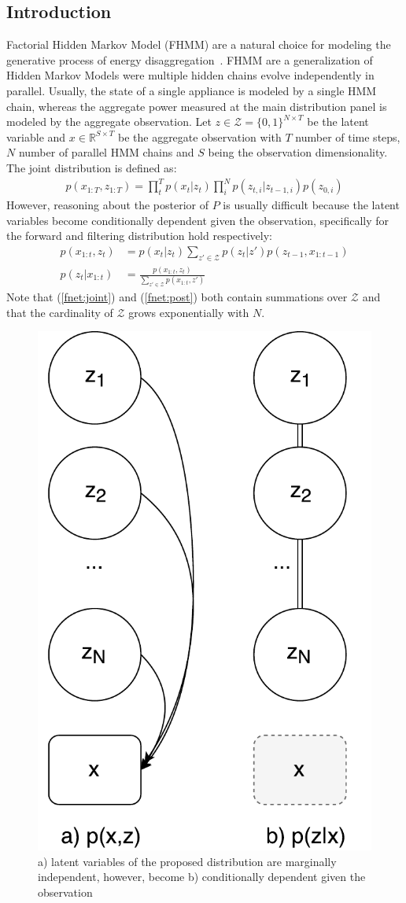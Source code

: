 \subsection{Introduction}
Factorial Hidden Markov Model \cite{ghahramani1997factorial} (FHMM) are a natural choice for modeling the generative process of energy disaggregation~\cite{kolter2012fhmm,lange2016varbolt,ng2016scaling,hart1992}. FHMM are a generalization of Hidden Markov Models were multiple hidden chains evolve independently in parallel. Usually, the state of a single appliance is modeled by a single HMM chain, whereas the aggregate power measured at the main distribution panel is modeled by the aggregate observation. Let $z \in \mathcal{Z} = \{0,1\}^{N \times T}$ be the latent variable and $x \in \mathbb{R}^{S \times T}$ be the aggregate observation with $T$ number of time steps, $N$ number of parallel HMM chains and $S$ being the observation dimensionality. The joint distribution is defined as: \begin{align*}
p(x_{1:T},z_{1:T}) = \prod_t^T p(x_t|z_t)\prod_i^N p(z_{t,i}|z_{t-1,i})p(z_{0,i})
\end{align*} However, reasoning about the posterior of $P$ is usually difficult because the latent variables become conditionally dependent given the observation, specifically for the forward and filtering distribution hold respectively:
\begin{align}
p(x_{1:t},z_t) &= p(x_t|z_t) \sum_{z' \in \mathcal{Z}} p(z_t|z') p(z_{t-1}, x_{1:t-1}) \label{fnet:joint}\\
p(z_t|x_{1:t}) &= \frac{p(x_{1:t},z_t)}{\sum_{z' \in \mathcal{Z}} p(x_{1:t},z')} \label{fnet:post}
\end{align}
Note that (\ref{fnet:joint}) and (\ref{fnet:post}) both contain summations over $\mathcal{Z}$ and that the cardinality of $\mathcal{Z}$ grows exponentially with $N$.\\
\begin{figure}[!t]
\centering
\includegraphics[width=0.4\linewidth]{factornet/graphmod.pdf}
\caption[FactorNet: Latent variable models and independence structure.]{a) latent variables of the proposed distribution are marginally independent, however, become b) conditionally dependent given the observation}
\label{fnet:graphmod}
\end{figure}
